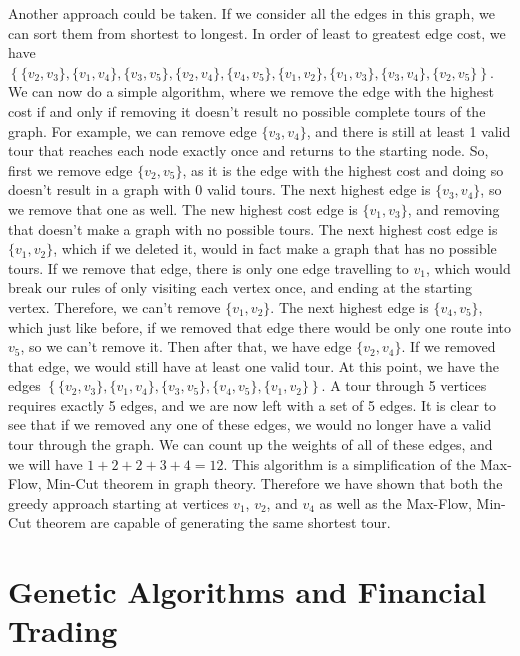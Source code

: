 \documentclass{article}
\renewcommand{\_}{\ifincsname_\else\legacyunderscore\fi}
\begin{document}
Another approach could be taken. If we consider all the edges in this graph, we can sort them from shortest to longest. In order of least to greatest edge cost, we have $\left\{\{v_2, v_3\}, \{v_1, v_4\}, \{v_3, v_5\}, \{v_2, v_4\}, \{v_4, v_5\}, \{v_1, v_2\}, \{v_1, v_3\}, \{v_3, v_4\}, \{v_2, v_5\}\right\}$. We can now do a simple algorithm, where we remove the edge with the highest cost if and only if removing it doesn't result no possible complete tours of the graph. For example, we can remove edge $\{v_3, v_4\}$, and there is still at least 1 valid tour that reaches each node exactly once and returns to the starting node. So, first we remove edge $\{v_2, v_5\}$, as it is the edge with the highest cost and doing so doesn't result in a graph with 0 valid tours. The next highest edge is $\{v_3, v_4\}$, so we remove that one as well. The new highest cost edge is $\{v_1, v_3\}$, and removing that doesn't make a graph with no possible tours. The next highest cost edge is $\{v_1, v_2\}$, which if we deleted it, would in fact make a graph that has no possible tours. If we remove that edge, there is only one edge travelling to $v_1$, which would break our rules of only visiting each vertex once, and ending at the starting vertex. Therefore, we can't remove $\{v_1, v_2\}$. The next highest edge is $\{v_4, v_5\}$, which just like before, if we removed that edge there would be only one route into $v_5$, so we can't remove it. Then after that, we have edge $\{v_2, v_4\}$. If we removed that edge, we would still have at least one valid tour. At this point, we have the edges $\left\{\{v_2, v_3\}, \{v_1, v_4\}, \{v_3, v_5\}, \{v_4, v_5\}, \{v_1, v_2\} \right\}$. A tour through 5 vertices requires exactly 5 edges, and we are now left with a set of 5 edges. It is clear to see that if we removed any one of these edges, we would no longer have a valid tour through the graph. We can count up the weights of all of these edges, and we will have $1 + 2 + 2 + 3 + 4 = 12$. This algorithm is a simplification of the Max-Flow, Min-Cut theorem in graph theory. Therefore we have shown that both the greedy approach starting at vertices $v_1$, $v_2$, and $v_4$ as well as the Max-Flow, Min-Cut theorem are capable of generating the same shortest tour. 

\newpage
\section*{Genetic Algorithms and Financial Trading}
\end{document}
